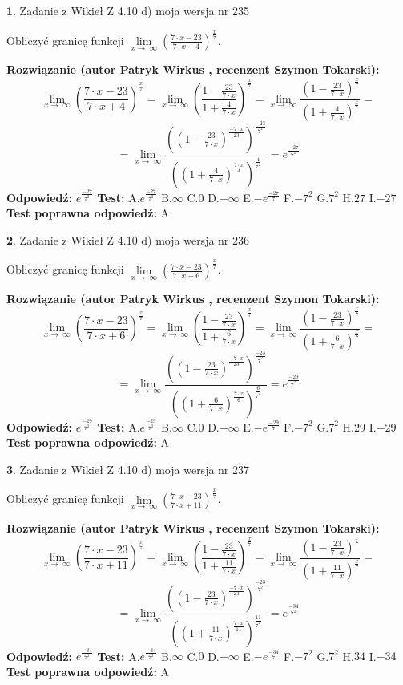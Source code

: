 \documentclass[12pt, a4paper]{article}
\theoremstyle{definition} %
\newtheorem{zad}{}
\newcommand{\zadStart}[1]{\begin{zad}#1\newline}
\newcommand{\zadStop}{\end{zad}}
\newcommand{\rozwStart}[2]{\noindent \textbf{Rozwiązanie (autor #1 , recenzent #2): }\newline}
\newcommand{\rozwStop}{\newline}
\newcommand{\odpStart}{\noindent \textbf{Odpowiedź:}\newline}
\newcommand{\odpStop}{\newline}
\newcommand{\testStart}{\noindent \textbf{Test:}\newline}
\newcommand{\testStop}{\newline}
\newcommand{\kluczStart}{\noindent \textbf{Test poprawna odpowiedź:}\newline}
\newcommand{\kluczStop}{\newline}
\begin{document}
\zadStart{Zadanie z Wikieł Z 4.10 d) moja wersja nr 235}


Obliczyć granicę funkcji  $\lim\limits_{x\to\ \infty}(\frac{7\cdot x-23}{7\cdot x+4})^{\frac{x}{7}}$.
\zadStop
\rozwStart{Patryk Wirkus}{Szymon Tokarski}
$$\lim\limits_{x\to\ \infty}(\frac{7\cdot x-23}{7\cdot x+4})^{\frac{x}{7}} = \lim\limits_{x\to\ \infty}(\frac{1-\frac{23}{7\cdot x}}{1+\frac{4}{7\cdot x}})^{\frac{x}{7}}=\lim\limits_{x\to\ \infty}\frac{(1-\frac{23}{7\cdot x})^{\frac{x}{7}}}{(1+\frac{4}{7\cdot x})^{\frac{x}{7}}}=$$
$$=\lim\limits_{x\to\ \infty}\frac{((1-\frac{23}{7\cdot x})^{\frac{-7\cdot x}{23}})^{\frac{-23}{7^{2}}}}{((1+\frac{4}{7\cdot x})^{\frac{7\cdot x}{4}})^{\frac{4}{7^{2}}}}=e^{\frac{-27}{7^{2}}}$$
\rozwStop
\odpStart
$e^{\frac{-27}{7^{2}}}$
\odpStop
\testStart
A.$e^{\frac{-27}{7^{2}}}$ B.$\infty$ C.$0$ D.$-\infty$ E.$-e^{\frac{-27}{7}}$
F.$-7^{2}$ G.$7^{2}$
H.$27$
I.$-27$
\testStop
\kluczStart
A
\kluczStop



\zadStart{Zadanie z Wikieł Z 4.10 d) moja wersja nr 236}


Obliczyć granicę funkcji  $\lim\limits_{x\to\ \infty}(\frac{7\cdot x-23}{7\cdot x+6})^{\frac{x}{7}}$.
\zadStop
\rozwStart{Patryk Wirkus}{Szymon Tokarski}
$$\lim\limits_{x\to\ \infty}(\frac{7\cdot x-23}{7\cdot x+6})^{\frac{x}{7}} = \lim\limits_{x\to\ \infty}(\frac{1-\frac{23}{7\cdot x}}{1+\frac{6}{7\cdot x}})^{\frac{x}{7}}=\lim\limits_{x\to\ \infty}\frac{(1-\frac{23}{7\cdot x})^{\frac{x}{7}}}{(1+\frac{6}{7\cdot x})^{\frac{x}{7}}}=$$
$$=\lim\limits_{x\to\ \infty}\frac{((1-\frac{23}{7\cdot x})^{\frac{-7\cdot x}{23}})^{\frac{-23}{7^{2}}}}{((1+\frac{6}{7\cdot x})^{\frac{7\cdot x}{6}})^{\frac{6}{7^{2}}}}=e^{\frac{-29}{7^{2}}}$$
\rozwStop
\odpStart
$e^{\frac{-29}{7^{2}}}$
\odpStop
\testStart
A.$e^{\frac{-29}{7^{2}}}$ B.$\infty$ C.$0$ D.$-\infty$ E.$-e^{\frac{-29}{7}}$
F.$-7^{2}$ G.$7^{2}$
H.$29$
I.$-29$
\testStop
\kluczStart
A
\kluczStop



\zadStart{Zadanie z Wikieł Z 4.10 d) moja wersja nr 237}


Obliczyć granicę funkcji  $\lim\limits_{x\to\ \infty}(\frac{7\cdot x-23}{7\cdot x+11})^{\frac{x}{7}}$.
\zadStop
\rozwStart{Patryk Wirkus}{Szymon Tokarski}
$$\lim\limits_{x\to\ \infty}(\frac{7\cdot x-23}{7\cdot x+11})^{\frac{x}{7}} = \lim\limits_{x\to\ \infty}(\frac{1-\frac{23}{7\cdot x}}{1+\frac{11}{7\cdot x}})^{\frac{x}{7}}=\lim\limits_{x\to\ \infty}\frac{(1-\frac{23}{7\cdot x})^{\frac{x}{7}}}{(1+\frac{11}{7\cdot x})^{\frac{x}{7}}}=$$
$$=\lim\limits_{x\to\ \infty}\frac{((1-\frac{23}{7\cdot x})^{\frac{-7\cdot x}{23}})^{\frac{-23}{7^{2}}}}{((1+\frac{11}{7\cdot x})^{\frac{7\cdot x}{11}})^{\frac{11}{7^{2}}}}=e^{\frac{-34}{7^{2}}}$$
\rozwStop
\odpStart
$e^{\frac{-34}{7^{2}}}$
\odpStop
\testStart
A.$e^{\frac{-34}{7^{2}}}$ B.$\infty$ C.$0$ D.$-\infty$ E.$-e^{\frac{-34}{7}}$
F.$-7^{2}$ G.$7^{2}$
H.$34$
I.$-34$
\testStop
\kluczStart
A
\kluczStop
\end{document}
